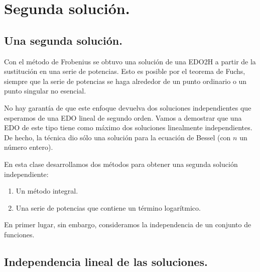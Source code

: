 \chapter{Segunda solución.}


\section{Una segunda solución.}

Con el método de Frobenius se obtuvo una solución de una EDO2H a partir de la sustitución en una serie de potencias. Esto es posible por el teorema de Fuchs, siempre que la serie de potencias se haga alrededor de un punto ordinario o un punto singular no esencial.
\par
No hay garantía de que este enfoque devuelva dos soluciones independientes que esperamos de una EDO lineal de segundo orden. Vamos a demostrar que una EDO de este tipo tiene como máximo dos soluciones linealmente independientes. De hecho, la técnica dio sólo una solución para la ecuación de Bessel (con $n$ un número entero).
\par
En esta clase desarrollamos dos métodos para obtener una segunda solución independiente:
\begin{enumerate}
\item Un método integral.
\item Una serie de potencias que contiene un término logarítmico.
\end{enumerate}
En primer lugar, sin embargo, consideramos la independencia de un conjunto de funciones.

\section{Independencia lineal de las soluciones.}

